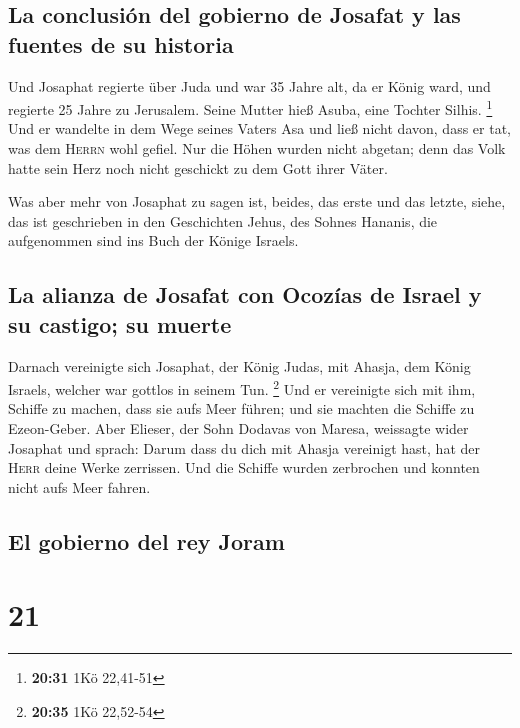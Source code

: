 \hypertarget{la-conclusiuxf3n-del-gobierno-de-josafat-y-las-fuentes-de-su-historia}{%
\subsection{La conclusión del gobierno de Josafat y las fuentes de su
historia}\label{la-conclusiuxf3n-del-gobierno-de-josafat-y-las-fuentes-de-su-historia}}

 Und Josaphat regierte über Juda und war 35 Jahre alt, da
er König ward, und regierte 25 Jahre zu Jerusalem. Seine Mutter hieß
Asuba, eine Tochter Silhis. \footnote{\textbf{20:31} 1Kö 22,41-51}
 Und er wandelte in dem Wege seines Vaters Asa und ließ
nicht davon, dass er tat, was dem \textsc{Herrn} wohl gefiel.
 Nur die Höhen wurden nicht abgetan; denn das Volk hatte
sein Herz noch nicht geschickt zu dem Gott ihrer Väter.

 Was aber mehr von Josaphat zu sagen ist, beides, das
erste und das letzte, siehe, das ist geschrieben in den Geschichten
Jehus, des Sohnes Hananis, die aufgenommen sind ins Buch der Könige
Israels.

\hypertarget{la-alianza-de-josafat-con-ocozuxedas-de-israel-y-su-castigo-su-muerte}{%
\subsection{La alianza de Josafat con Ocozías de Israel y su castigo; su
muerte}\label{la-alianza-de-josafat-con-ocozuxedas-de-israel-y-su-castigo-su-muerte}}

 Darnach vereinigte sich Josaphat, der König Judas, mit
Ahasja, dem König Israels, welcher war gottlos in seinem Tun.
\footnote{\textbf{20:35} 1Kö 22,52-54}  Und er vereinigte
sich mit ihm, Schiffe zu machen, dass sie aufs Meer führen; und sie
machten die Schiffe zu Ezeon-Geber.  Aber Elieser, der
Sohn Dodavas von Maresa, weissagte wider Josaphat und sprach: Darum dass
du dich mit Ahasja vereinigt hast, hat der \textsc{Herr} deine Werke
zerrissen. Und die Schiffe wurden zerbrochen und konnten nicht aufs Meer
fahren.

\hypertarget{el-gobierno-del-rey-joram}{%
\subsection{El gobierno del rey Joram}\label{el-gobierno-del-rey-joram}}

\hypertarget{section-20}{%
\section{21}\label{section-20}}

